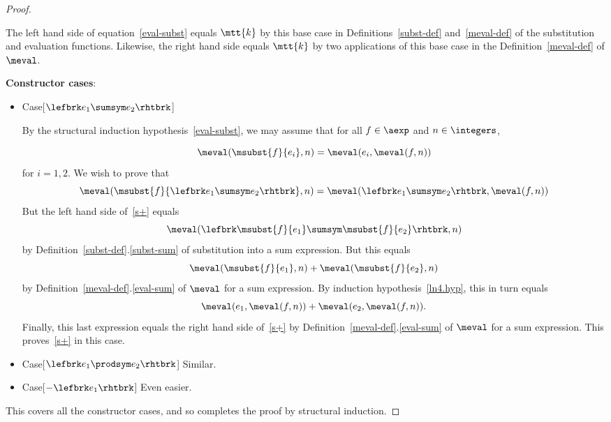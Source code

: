 \begin{definition}
\begin{proof}
\begin{itemize}
  The left hand side of equation~\eqref{eval-subst} equals $\mtt{k}$ by
  this base case in Definitions~\ref{subst-def} and~\ref{meval-def} of
  the substitution and evaluation functions.  Likewise, the right hand
  side equals $\mtt{k}$ by two applications of this base case in the
  Definition~\ref{meval-def} of $\meval$.

\end{itemize}

\textbf{Constructor cases}:
\begin{itemize}

\item Case[$\lefbrk e_1 \sumsym e_2 \rhtbrk$]

  By the structural induction hypothesis~\eqref{eval-subst}, we may assume
  that for all $f \in \aexp$ and $n \in \integers$,

\begin{equation}\label{ln4.hyp}
\meval(\msubst{f}{e_i},n)  =  \meval(e_i, \meval(f,n))
\end{equation}
for $i= 1,2$.  We wish to prove that
\begin{equation}\label{s+}
\meval(\msubst{f}{\lefbrk e_1\sumsym e_2 \rhtbrk},n)  =  \meval(\lefbrk e_1 \sumsym e_2 \rhtbrk, \meval(f,n))
\end{equation}
But the left hand side of~\eqref{s+} equals
\[
\meval(\lefbrk \msubst{f}{e_1} \sumsym \msubst{f}{e_2} \rhtbrk, n)
\]
by Definition~\ref{subst-def}.\ref{subst-sum} of substitution into a sum
expression.  But this equals
\[
\meval(\msubst{f}{e_1},n) + \meval(\msubst{f}{e_2},n)
\]
by Definition~\ref{meval-def}.\eqref{eval-sum} of $\meval$ for a sum expression.  By
induction hypothesis~\eqref{ln4.hyp}, this in turn equals
\[
\meval(e_1,\meval(f,n)) + \meval(e_2,\meval(f,n)).
\]
Finally, this last expression equals the right hand side of~\eqref{s+} by
Definition~\ref{meval-def}.\eqref{eval-sum} of $\meval$ for a sum
expression.  This proves~\eqref{s+} in this case.

\item Case[$\lefbrk e_1 \prodsym e_2 \rhtbrk$]  Similar.

\item Case[$-\lefbrk e_1 \rhtbrk$]  Even easier.

\end{itemize}

This covers all the constructor cases, and so completes the proof by
structural induction.

\end{proof}



\end{definition}

